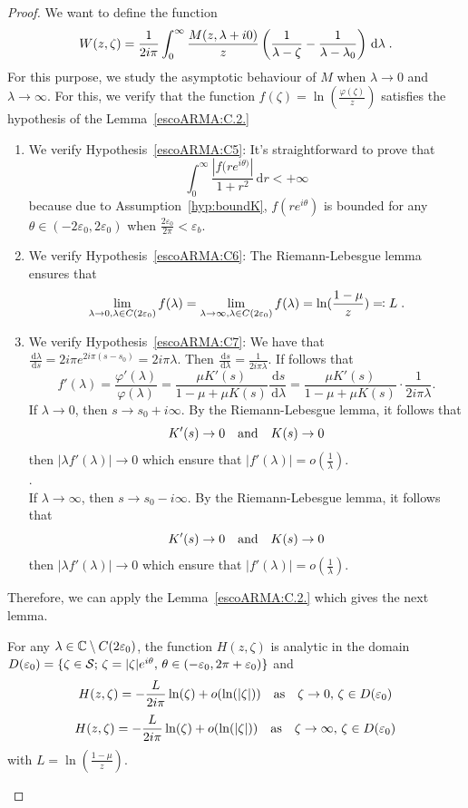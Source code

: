 \documentclass[11pt]{amsart}
\newcommand{\diff}{\,\mathrm{d}}
\begin{document}
\begin{proof}
We want to define the function
\begin{align}\label{def:W}
    W(z, \zeta) = \frac{1}{2i\pi }\int_0^\infty  \frac{M(z,\lambda+i0)}{z}\left( \frac{1}{\lambda-\zeta} - \frac{1}{\lambda-\lambda_0}\right) \diff \lambda 
    \eqfinp
\end{align}
For this purpose, we study the asymptotic behaviour of $M$ when $\lambda \to 0$ and $\lambda \to \infty$. For this, we verify that the function $f(\zeta) = \ln(\frac{\varphi(\zeta)}{z})$ satisfies the hypothesis of the Lemma~\ref{escoARMA:C.2.}
\begin{enumerate}
\item We verify Hypothesis~\eqref{escoARMA:C5}: It's straightforward to prove that 
    $$\int_0^\infty \frac{|f(r e^{i\theta)}|}{1+r^2}\diff r < +\infty$$ because due to Assumption~\ref{hyp:boundK}, $f(re^{i\theta})$ is bounded for any $\theta \in (-2\varepsilon_0, 2\varepsilon_0)$ when $\frac{2\varepsilon_0}{2\pi} < \varepsilon_b$. 
    \item We verify Hypothesis~\eqref{escoARMA:C6}: The Riemann-Lebesgue lemma ensures that 
    $$ \lim_{\lambda \to 0, \lambda \in C(2\varepsilon_0)} f(\lambda) = 
     \lim_{\lambda \to \infty, \lambda \in C(2\varepsilon_0)} f(\lambda)=\ln(\frac{1-\mu}{z}) 
 \eqqcolon L\; .$$
    \item We verify Hypothesis~\eqref{escoARMA:C7}: We have that $\frac{\diff \lambda}{\diff s} = 2i\pi e^{2i\pi(s-s_0)} = 2i\pi \lambda$. Then 
    $\frac{\diff s}{\diff \lambda} = \frac{1}{2i\pi\lambda}$. 
    If follows that 
    $$f'(\lambda) = \frac{\varphi'(\lambda)}{\varphi(\lambda)} = \frac{\mu K'(s)}{1 - \mu + \mu K(s)}\frac{\diff s}{\diff \lambda} = \frac{\mu K'(s)}{1 - \mu + \mu K(s)} \cdot \frac{1}{2i\pi\lambda}. $$
    If $\lambda \to 0$, then $s \to s_0+i\infty$. By the Riemann-Lebesgue lemma, it follows that $$K'(s) \to 0 \quad \text{and} \quad K(s) \to 0$$ then  $|\lambda f'(\lambda)| \to 0$ which ensure that $|f'(\lambda)| = o(\frac{1}{\lambda})$. \\. \\
    If $\lambda \to \infty$, then $s \to s_0-i\infty$. By the Riemann-Lebesgue lemma, it follows that $$K'(s) \to 0 \quad \text{and} \quad K(s) \to 0$$ then  $|\lambda f'(\lambda)| \to 0$ which ensure that $|f'(\lambda)| = o(\frac{1}{\lambda})$. \\
\end{enumerate}
Therefore, we can apply the Lemma~\ref{escoARMA:C.2.} which gives the next lemma. 

\begin{lemma}\label{EscARMA:C2}For any $\lambda \in \mathbb{C} \setminus C(2\varepsilon_0)$, the function $H(z,\zeta)$ is analytic in the domain $D(\varepsilon_0) = \{ \zeta \in \mathcal{S}; \, \zeta = |\zeta|e^{i\theta}, \, \theta \in (-\varepsilon_0, 2\pi+\varepsilon_0)\}$ and 
$$ H(z, \zeta) = -\frac{L}{2i\pi } \ln(\zeta) + o(\ln(|\zeta|)) \quad \text{as} \quad \zeta\to 0,\, \zeta \in D(\varepsilon_0)$$ 
$$ H(z, \zeta) = -\frac{L}{2i\pi } \ln(\zeta) + o(\ln(|\zeta|)) \quad \text{as} \quad \zeta\to \infty,\, \zeta \in D(\varepsilon_0)$$ 
with $L = \ln(\frac{1-\mu}{z})$. 
\end{lemma}


\end{proof}
\end{document}
